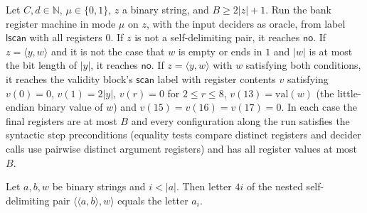\begin{theorem}
\label{Complexity.epad_bank_pre}
\leanok
{}
Let $C, d \in \mathbb{N}$, $\mu \in \{0,1\}$, $z$ a binary string, and $B \ge 2|z| + 1$.
Run the bank register machine in mode $\mu$ on $z$, with the input deciders as oracle, from
label $\mathsf{lscan}$ with all registers $0$. If $z$ is not a self-delimiting pair, it reaches
$\mathsf{no}$. If $z = \langle y, w\rangle$ and it is not the case that $w$ is empty or ends in
$1$ and $|w|$ is at most the bit length of $|y|$, it reaches $\mathsf{no}$. If $z = \langle y,
w\rangle$ with $w$ satisfying both conditions, it reaches the validity block's $\mathsf{scan}$
label with register contents $v$ satisfying $v(0) = 0$, $v(1) = 2|y|$, $v(r) = 0$ for
$2 \le r \le 8$, $v(13) = \mathrm{val}(w)$ (the little-endian binary value of $w$) and
$v(15) = v(16) = v(17) = 0$. In each case the final registers are at most $B$ and every configuration along the run satisfies the syntactic step preconditions (equality tests compare distinct registers and decider calls use pairwise distinct argument registers) and has all register values at most $B$.
\end{theorem}

\begin{lemma}
\label{Complexity.epad_getD_four}
\leanok
{}
Let $a, b, w$ be binary strings and $i < |a|$. Then letter $4i$ of the nested self-delimiting
pair $\langle\langle a, b\rangle, w\rangle$ equals the letter $a_i$.
\end{lemma}

